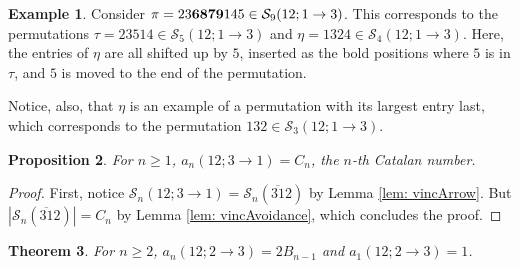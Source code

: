 \documentclass[11pt]{article}
\renewcommand\S{\mathcal S}
\newtheorem{theorem}{Theorem}[section]
\newtheorem{proposition}[theorem]{Proposition}
\theoremstyle{definition}
\newtheorem{example}[theorem]{Example}
\begin{document}
\begin{example}\label{ex: 12t13}
    Consider $\pi = 23{\bf 6879}145 \in \S_9(12;1\to3)$. This corresponds to the permutations $\tau = 23514 \in \S_5(12;1 \to 3)$ and $\eta = 1324 \in \S_4(12;1\to3)$. Here, the entries of $\eta$ are all shifted up by $5$, inserted as the bold positions where $5$ is in $\tau$, and $5$ is moved to the end of the permutation.
    
    Notice, also, that $\eta$ is an example of a permutation with its largest entry last, which corresponds to the permutation $132 \in \S_3(12;1\to3)$.
\end{example}

\begin{proposition} \label{prop:12t31}
    For $n\geq 1$, $a_n(12;3\to1) = C_n$, the $n$-th Catalan number.
\end{proposition}

\begin{proof}
    First, notice $\S_n(12; 3 \to 1) = \S_n(\overline{31}2)$ by Lemma \ref{lem: vincArrow}. But $|\S_n(\overline{31}2)| = C_n$ by Lemma \ref{lem: vincAvoidance}, which concludes the proof.
\end{proof}

\begin{theorem} \label{thm:12t23}
    For $n \geq 2$, $a_n(12; 2 \to 3) = 2B_{n-1}$ and $a_1(12; 2 \to 3) = 1$.
\end{theorem}
\end{document}
